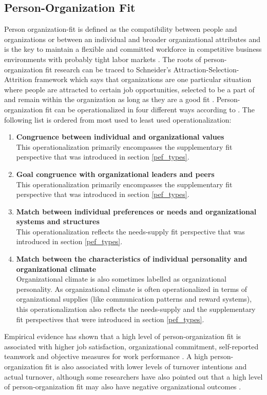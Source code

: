 \documentclass[draft,final]{thesisclass} %
\begin{document}
\subsection{Person-Organization Fit}
Person organization-fit is defined as the compatibility between people and organizations or between an individual and broader organizational attributes and is the key to maintain a flexible and committed workforce in competitive business environments with probably tight labor markets \parencite[182]{po_and_pj_fit_literature_review}.
The roots of person-organization fit research can be traced to Schneider's Attraction-Selection-Attrition framework which says that organizations are one particular situation where people are attracted to certain job opportunities, selected to be a part of and remain within the organization as long as they are a good fit \parencite[182]{po_and_pj_fit_literature_review}.
Person-organization fit can be operationalized in four different ways according to \textcite[182]{po_and_pj_fit_literature_review}. The following list is ordered from most used to least used operationalization:
\begin{enumerate}
    \item \textbf{Congruence between individual and organizational values}\\
    This operationalization primarily encompasses the supplementary fit perspective that was introduced in section \ref{pef_types}.
    \item \textbf{Goal congruence with organizational leaders and peers}\\
    This operationalization primarily encompasses the supplementary fit perspective that was introduced in section \ref{pef_types}.
    \item \textbf{Match between individual preferences or needs and organizational systems and structures}\\
    This operationalization reflects the needs-supply fit perspective that was introduced in section \ref{pef_types}.
    \item \textbf{Match between the characteristics of individual personality and organizational climate}\\
    Organizational climate is also sometimes labelled as organizational personality.
    As organizational climate is often operationalized in terms of organizational supplies (like communication patterns and reward systems), this operationalization also reflects the needs-supply and the supplementary fit perspectives that were introduced in section \ref{pef_types}.
\end{enumerate}
Empirical evidence has shown that a high level of person-organization fit is associated with higher job satisfaction, organizational commitment, self-reported teamwork and objective measures for work performance \parencite[183]{po_and_pj_fit_literature_review}.
A high person-organization fit is also associated with lower levels of turnover intentions and actual turnover, although some researchers have also pointed out that a high level of person-organization fit may also have negative organizational outcomes \parencite[183]{po_and_pj_fit_literature_review}.
\end{document}
